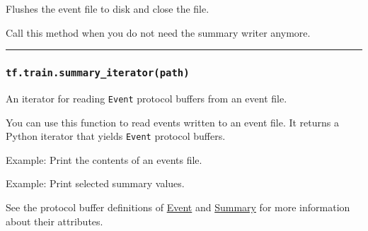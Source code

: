 Flushes the event file to disk and close the file.

Call this method when you do not need the summary writer anymore.

\begin{center}\rule{0.5\linewidth}{\linethickness}\end{center}

\subsubsection{\texorpdfstring{\texttt{tf.train.summary\_iterator(path)}
}{tf.train.summary\_iterator(path) }}\label{tf.train.summaryux5fiteratorpath}

An iterator for reading \texttt{Event} protocol buffers from an event
file.

You can use this function to read events written to an event file. It
returns a Python iterator that yields \texttt{Event} protocol buffers.

Example: Print the contents of an events file.

\begin{Shaded}
\begin{Highlighting}[]
  \NormalTok{):}
     
\end{Highlighting}
\end{Shaded}

Example: Print selected summary values.

\begin{Shaded}
\begin{Highlighting}[]
  \NormalTok{):}
      
         \OperatorTok{==} \NormalTok{:}
             
\end{Highlighting}
\end{Shaded}

See the protocol buffer definitions of
\href{https://tensorflow.googlesource.com/tensorflow/+/master/tensorflow/core/util/event.proto}{Event}
and
\href{https://tensorflow.googlesource.com/tensorflow/+/master/tensorflow/core/framework/summary.proto}{Summary}
for more information about their attributes.

